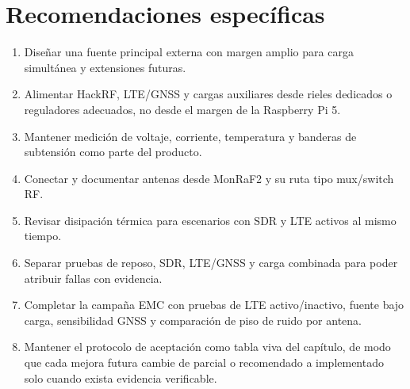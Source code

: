 \section{Recomendaciones específicas}

\begin{enumerate}[leftmargin=*]
    \item Diseñar una fuente principal externa con margen amplio para carga
    simultánea y extensiones futuras.
    \item Alimentar HackRF, LTE/GNSS y cargas auxiliares desde rieles dedicados o
    reguladores adecuados, no desde el margen de la Raspberry Pi 5.
    \item Mantener medición de voltaje, corriente, temperatura y banderas de
    subtensión como parte del producto.
    \item Conectar y documentar antenas desde MonRaF2 y su ruta tipo mux/switch RF.
    \item Revisar disipación térmica para escenarios con SDR y LTE activos al
    mismo tiempo.
    \item Separar pruebas de reposo, SDR, LTE/GNSS y carga combinada para poder
    atribuir fallas con evidencia.
    \item Completar la campaña EMC con pruebas de LTE activo/inactivo, fuente bajo
    carga, sensibilidad GNSS y comparación de piso de ruido por antena.
    \item Mantener el protocolo de aceptación como tabla viva del capítulo, de
    modo que cada mejora futura cambie de parcial o recomendado a implementado
    solo cuando exista evidencia verificable.
\end{enumerate}
